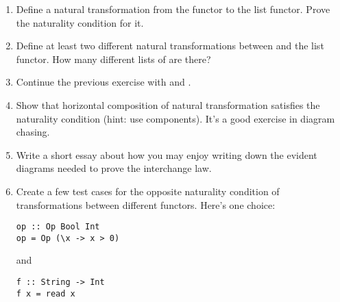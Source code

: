 \begin{enumerate}
\tightlist
\item
  Define a natural transformation from the  functor to the
  list functor. Prove the naturality condition for it.
\item
  Define at least two different natural transformations between
   and the list functor. How many different lists of
  \code{()} are there?
\item
  Continue the previous exercise with  and
  .
\item
  Show that horizontal composition of natural transformation satisfies
  the naturality condition (hint: use components). It's a good exercise
  in diagram chasing.
\item
  Write a short essay about how you may enjoy writing down the evident
  diagrams needed to prove the interchange law.
\item
  Create a few test cases for the opposite naturality condition of
  transformations between different  functors. Here's one
  choice:

\begin{Verbatim}
op :: Op Bool Int
op = Op (\x -> x > 0)
\end{Verbatim}
and

\begin{Verbatim}[commandchars=\\\{\}]
f :: String -> Int
f x = read x
\end{Verbatim}
\end{enumerate}
